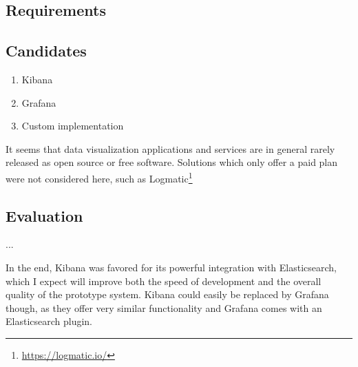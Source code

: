 \subsection{Requirements}

\subsection{Candidates}

\begin{enumerate}
\item Kibana
\item Grafana
\item Custom implementation
\end{enumerate}

It seems that data visualization applications and services are in general rarely released as open source or free software.
Solutions which only offer a paid plan were not considered here, such as Logmatic\footnote{\url{https://logmatic.io/}}

\subsection{Evaluation}

...

In the end, Kibana was favored for its powerful integration with Elasticsearch, which I expect will improve both the speed of development and the overall quality of the prototype system.
Kibana could easily be replaced by Grafana though, as they offer very similar functionality and Grafana comes with an Elasticsearch plugin.
